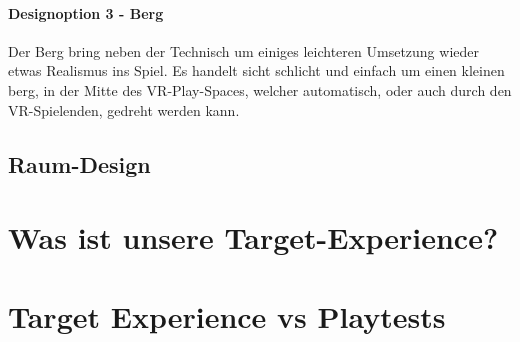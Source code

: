 \paragraph{Designoption 3 - Berg}

Der Berg bring neben der Technisch um einiges leichteren Umsetzung wieder etwas Realismus ins Spiel. Es handelt sicht schlicht und einfach um einen kleinen berg, in der Mitte des VR-Play-Spaces, welcher automatisch, oder auch durch den VR-Spielenden, gedreht werden kann.

\subsection{Raum-Design}

\section{Was ist unsere Target-Experience?}

\section{Target Experience vs Playtests}

